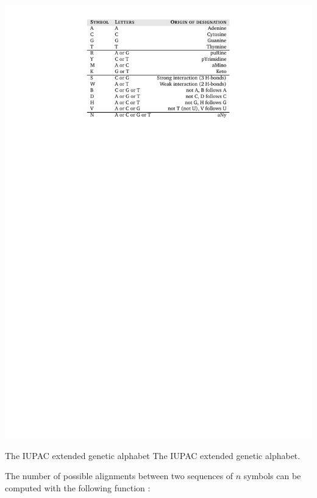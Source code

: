 \begin{table}[t!]
\begin{center}
\begin{minipage}{0.7\linewidth}\setlength{\parindent}{0pt}
\includegraphics[bb=155 621 498 815,clip]{tables/code1}
\end{minipage}
          {The IUPAC extended genetic alphabet}%
          {The IUPAC extended genetic alphabet.}%
          {}
\end{center}
\end{table}



The number of possible alignments between two sequences of $n$ symbols can be computed with the 
following function \citep{waterman:1984a,waterman:1995a}:

